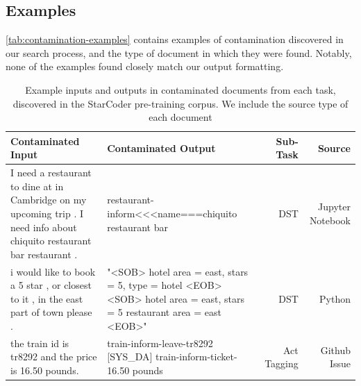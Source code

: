 \documentclass[11pt]{article}
\begin{document}
\subsection{Examples}
\autoref{tab:contamination-examples} contains examples of contamination discovered in our search process, and the type of document in which they were found. Notably, none of the examples found closely match our output formatting.

\begin{table}[htbp]
    \centering
    \begin{tabular}{>{\raggedright\arraybackslash}p{}|>{\raggedright\arraybackslash}p{}|r|r}
        \textbf{Contaminated Input} & \textbf{Contaminated Output} & \textbf{Sub-Task} & \textbf{Source}  \\ 
        \hline
         I need a restaurant to dine at in Cambridge on my upcoming trip . I need info about chiquito restaurant bar restaurant . & restaurant-inform<<<name===chiquito restaurant bar & DST & Jupyter Notebook \\
         \hline 
         i would like to book a 5 star , or closest to it , in the east part of town please . & "<SOB> hotel { area = east, stars = 5, type = hotel } <EOB>
<SOB> hotel { area = east, stars = 5 } restaurant { area = east } <EOB>" & DST & Python  \\
        \hline
                 [Syst] the train id is tr8292 and the price is 16.50 pounds. & [SYS\_DA] train-inform-leave-tr8292
                [SYS\_DA] train-inform-ticket-16.50 pounds & Act Tagging & Github Issue \\
        \hline
    \end{tabular}
    \caption{Example inputs and outputs in contaminated documents from each task, discovered in the StarCoder pre-training corpus. We include the source type of each document}
    \label{tab:contamination-examples}
\end{table}
\end{document}
